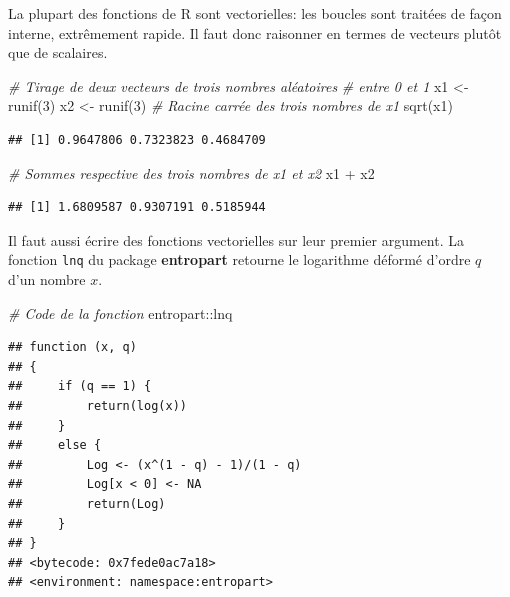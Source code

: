 \documentclass[
  11pt,
  french,
  a4paper,
  extrafontsizes,onecolumn,openright
  ]{memoir}
\newenvironment{Shaded}{\begin{snugshade}}{\end{snugshade}}
\newcommand{\CommentTok}[1]{\textcolor[rgb]{0.56,0.35,0.01}{\textit{#1}}}
\newcommand{\DecValTok}[1]{\textcolor[rgb]{0.00,0.00,0.81}{#1}}
\newcommand{\FunctionTok}[1]{\textcolor[rgb]{0.00,0.00,0.00}{#1}}
\newcommand{\NormalTok}[1]{#1}
\newcommand{\OtherTok}[1]{\textcolor[rgb]{0.56,0.35,0.01}{#1}}
\newcommand{\SpecialCharTok}[1]{\textcolor[rgb]{0.00,0.00,0.00}{#1}}
\begin{document}
La plupart des fonctions de R sont vectorielles: les boucles sont traitées de façon interne, extrêmement rapide.
Il faut donc raisonner en termes de vecteurs plutôt que de scalaires.

\scriptsize

\begin{Shaded}
\begin{Highlighting}[]
\CommentTok{\# Tirage de deux vecteurs de trois nombres aléatoires}
\CommentTok{\# entre 0 et 1}
\NormalTok{x1 }\OtherTok{\textless{}{-}} \FunctionTok{runif}\NormalTok{(}\DecValTok{3}\NormalTok{)}
\NormalTok{x2 }\OtherTok{\textless{}{-}} \FunctionTok{runif}\NormalTok{(}\DecValTok{3}\NormalTok{)}
\CommentTok{\# Racine carrée des trois nombres de x1}
\FunctionTok{sqrt}\NormalTok{(x1)}
\end{Highlighting}
\end{Shaded}

\begin{verbatim}
## [1] 0.9647806 0.7323823 0.4684709
\end{verbatim}

\begin{Shaded}
\begin{Highlighting}[]
\CommentTok{\# Sommes respective des trois nombres de x1 et x2}
\NormalTok{x1 }\SpecialCharTok{+}\NormalTok{ x2}
\end{Highlighting}
\end{Shaded}

\begin{verbatim}
## [1] 1.6809587 0.9307191 0.5185944
\end{verbatim}

\normalsize

Il faut aussi écrire des fonctions vectorielles sur leur premier argument.
La fonction \texttt{lnq} du package \textbf{entropart} retourne le logarithme déformé d'ordre \(q\) d'un nombre \(x\).

\scriptsize

\begin{Shaded}
\begin{Highlighting}[]
\CommentTok{\# Code de la fonction}
\NormalTok{entropart}\SpecialCharTok{::}\NormalTok{lnq}
\end{Highlighting}
\end{Shaded}

\begin{verbatim}
## function (x, q) 
## {
##     if (q == 1) {
##         return(log(x))
##     }
##     else {
##         Log <- (x^(1 - q) - 1)/(1 - q)
##         Log[x < 0] <- NA
##         return(Log)
##     }
## }
## <bytecode: 0x7fede0ac7a18>
## <environment: namespace:entropart>
\end{verbatim}
\end{document}
